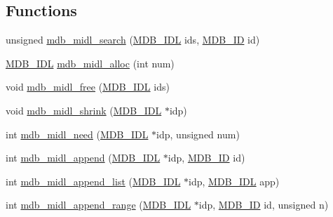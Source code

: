 \subsection*{Functions}
\begin{DoxyCompactItemize}
\item 
unsigned \mbox{\hyperlink{group__idls_ga9133d7b3849e2508c7bc690db039444d}{mdb\+\_\+midl\+\_\+search}} (\mbox{\hyperlink{group__idls_ga238cc39c422225e05cb3897e641ca9e5}{M\+D\+B\+\_\+\+I\+DL}} ids, \mbox{\hyperlink{group__idls_ga792192229a977c49f083846b5635f92d}{M\+D\+B\+\_\+\+ID}} id)
\item 
\mbox{\hyperlink{group__idls_ga238cc39c422225e05cb3897e641ca9e5}{M\+D\+B\+\_\+\+I\+DL}} \mbox{\hyperlink{group__idls_gab239e78f44ae65ce84c1a63c99f14b19}{mdb\+\_\+midl\+\_\+alloc}} (int num)
\item 
void \mbox{\hyperlink{group__idls_ga16e7b3139783126c1e39b5d7f7fb625d}{mdb\+\_\+midl\+\_\+free}} (\mbox{\hyperlink{group__idls_ga238cc39c422225e05cb3897e641ca9e5}{M\+D\+B\+\_\+\+I\+DL}} ids)
\item 
void \mbox{\hyperlink{group__idls_ga862ec13c8ff2aa805203a3c8c342153a}{mdb\+\_\+midl\+\_\+shrink}} (\mbox{\hyperlink{group__idls_ga238cc39c422225e05cb3897e641ca9e5}{M\+D\+B\+\_\+\+I\+DL}} $\ast$idp)
\item 
int \mbox{\hyperlink{group__idls_ga27374e3827d673a748c843fffce1a48f}{mdb\+\_\+midl\+\_\+need}} (\mbox{\hyperlink{group__idls_ga238cc39c422225e05cb3897e641ca9e5}{M\+D\+B\+\_\+\+I\+DL}} $\ast$idp, unsigned num)
\item 
int \mbox{\hyperlink{group__idls_gaf1dc78a5648a20152672b6236f1879e9}{mdb\+\_\+midl\+\_\+append}} (\mbox{\hyperlink{group__idls_ga238cc39c422225e05cb3897e641ca9e5}{M\+D\+B\+\_\+\+I\+DL}} $\ast$idp, \mbox{\hyperlink{group__idls_ga792192229a977c49f083846b5635f92d}{M\+D\+B\+\_\+\+ID}} id)
\item 
int \mbox{\hyperlink{group__idls_ga21493a9f98c90f59d81c7197866ec076}{mdb\+\_\+midl\+\_\+append\+\_\+list}} (\mbox{\hyperlink{group__idls_ga238cc39c422225e05cb3897e641ca9e5}{M\+D\+B\+\_\+\+I\+DL}} $\ast$idp, \mbox{\hyperlink{group__idls_ga238cc39c422225e05cb3897e641ca9e5}{M\+D\+B\+\_\+\+I\+DL}} app)
\item 
int \mbox{\hyperlink{group__idls_gaccadab9afb9667e28c4e750a1d0696f8}{mdb\+\_\+midl\+\_\+append\+\_\+range}} (\mbox{\hyperlink{group__idls_ga238cc39c422225e05cb3897e641ca9e5}{M\+D\+B\+\_\+\+I\+DL}} $\ast$idp, \mbox{\hyperlink{group__idls_ga792192229a977c49f083846b5635f92d}{M\+D\+B\+\_\+\+ID}} id, unsigned n)
\item 

\end{DoxyCompactItemize}
